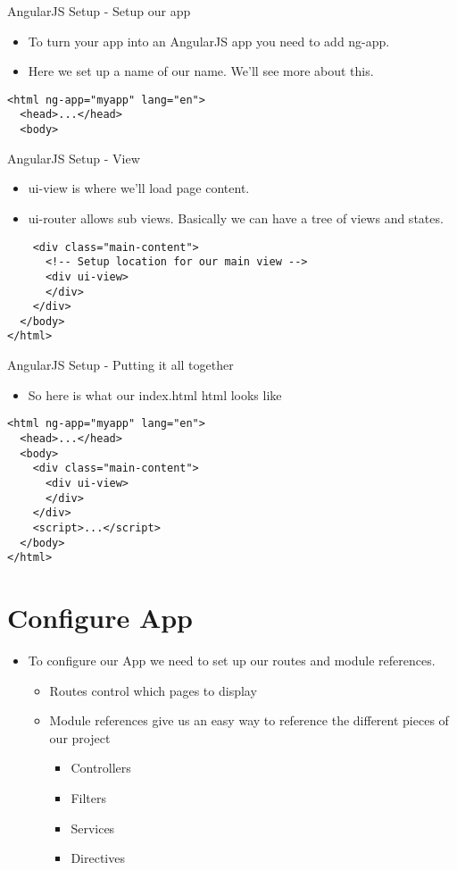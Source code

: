 \documentclass[presentation]{beamer}
\begin{document}
\begin{frame}[fragile,label=sec-2-2]{AngularJS Setup - Setup our app}
 \begin{itemize}
\item To turn your app into an AngularJS app you need to add ng-app.
\item Here we set up a name of our name. We'll see more about this.
\end{itemize}

\begin{verbatim}
<html ng-app="myapp" lang="en">
  <head>...</head>
  <body>
\end{verbatim}
\end{frame}

\begin{frame}[fragile,label=sec-2-3]{AngularJS Setup - View}
 \begin{itemize}
\item ui-view is where we'll load page content.
\item ui-router allows sub views. Basically we can
have a tree of views and states.
\end{itemize}

\begin{verbatim}
    <div class="main-content">
      <!-- Setup location for our main view -->
      <div ui-view>
      </div>
    </div>
  </body>
</html>
\end{verbatim}
\end{frame}

\begin{frame}[fragile,label=sec-2-4]{AngularJS Setup - Putting it all together}
 \begin{itemize}
\item So here is what our index.html html looks like
\end{itemize}
\begin{verbatim}
<html ng-app="myapp" lang="en">
  <head>...</head>
  <body>
    <div class="main-content">
      <div ui-view>
      </div>
    </div>
    <script>...</script>
  </body>
</html>
\end{verbatim}
\end{frame}

\section{Configure App}
\label{sec-3}
\begin{itemize}
\item To configure our App we need to set up our routes and module references.
\begin{itemize}
\item Routes control which pages to display
\item Module references give us an easy way to reference the different pieces of our project
\begin{itemize}
\item Controllers
\item Filters
\item Services
\item Directives
\end{itemize}
\end{itemize}
\end{itemize}
\end{document}
